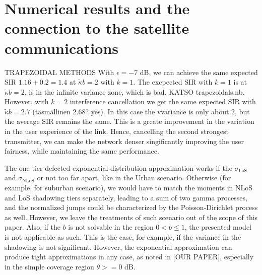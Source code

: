 \documentclass[conference]{IEEEtran}
\theoremstyle{definition}
\theoremstyle{plain}
\begin{document}
          \section{Numerical results and the connection to the satellite communications}
TRAPEZOIDAL METHODS
          With $\epsilon = -7$ dB, we can achieve the same expected SIR $1.16+0.2=1.4$ at $\tilde{\kappa} b= 2$ with $k=1$.  The excpected SIR with $k=1$ is at $\tilde{\kappa} b = 2$, is in the infinite variance zone, which is bad. KATSO trapezoidals.nb. However, with $k=2$ interference cancellation we get the same expected SIR with $\tilde{\kappa}b =2.7$ (täsmällinen $2.68$? yes). In this case the vvariance is  only about $2$, but the average SIR remains the same. This is a greate improvement in the variation in the user experience of the link.  Hence, cancelling the second strongest transmitter, we can make the network denser singificantly improving the user fairness, while maintaining the same performance. 
          
          
The one-tier defected exponential distribution approximation works if the $\sigma_{\text{LoS}}$ and $\sigma_{\text{NLoS}}$ or not too far apart, like in the Urban scenario. Otherwise (for example, for suburban scenario), we would have to match the moments in NLoS and LoS shadowing tiers separately, leading to a sum of two gamma processes, and the normalized jumps could be characterized by the Poisson-Dirichlet process as well. However, we leave the treatments of such scenario out of the scope of this paper. Also, if the $b$ is not solvable in the region $0<b\leq 1$, the presented model is not applicable as such. This is the case, for example, if the variance in the shadowing is not significant. However, the exponential approximation can produce tight approximations in any case, as noted in [OUR PAPER], especially in the simple coverage region $\theta >=0$ dB.
          

          
         
         
             
             
\end{document}
